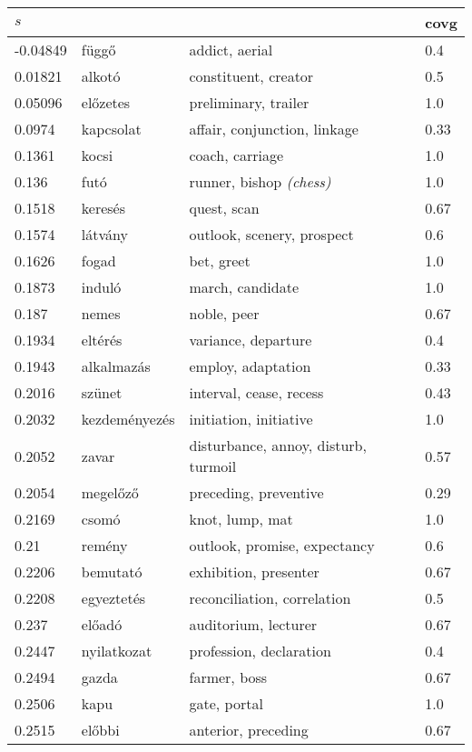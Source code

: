 \documentclass[11pt]{article}
\begin{document}
\begin{table*}
  \centering
    \small
  \begin{tabular}{llll}
    \toprule
    $s$     &         &                       & covg \\
    \midrule
-0.04849	& függő	& addict, aerial	& 0.4 \\
0.01821	& alkotó	& constituent, creator	& 0.5 \\
0.05096	& előzetes	& preliminary, trailer	& 1.0 \\
0.0974	& kapcsolat	& affair, conjunction, linkage	& 0.33 \\
0.1361	& kocsi	& coach, carriage	& 1.0 \\
    0.136	& futó	& runner, bishop \emph{(chess)}	& 1.0 \\
0.1518	& keresés	& quest, scan	& 0.67 \\
0.1574	& látvány	& outlook, scenery, prospect	& 0.6 \\
0.1626	& fogad	& bet, greet	& 1.0 \\
0.1873	& induló	& march, candidate	& 1.0 \\
0.187	& nemes	& noble, peer	& 0.67 \\
0.1934	& eltérés	& variance, departure	& 0.4 \\
0.1943	& alkalmazás	& employ, adaptation	& 0.33 \\
0.2016	& szünet	& interval, cease, recess	& 0.43 \\
0.2032	& kezdeményezés	& initiation, initiative	& 1.0 \\
0.2052	& zavar	& disturbance, annoy, disturb, turmoil	& 0.57 \\
0.2054	& megelőző	& preceding, preventive	& 0.29 \\
0.2169	& csomó	& knot, lump, mat	& 1.0 \\
0.21	& remény	& outlook, promise, expectancy	& 0.6 \\
0.2206	& bemutató	& exhibition, presenter	& 0.67 \\
0.2208	& egyeztetés	& reconciliation, correlation	& 0.5 \\
0.237	& előadó	& auditorium, lecturer	& 0.67 \\
0.2447	& nyilatkozat	& profession, declaration	& 0.4 \\
0.2494	& gazda	& farmer, boss	& 0.67 \\
0.2506	& kapu	& gate, portal	& 1.0 \\
0.2515	& előbbi	& anterior, preceding	& 0.67 \\

\end{tabular}
\end{table*}
\end{document}

